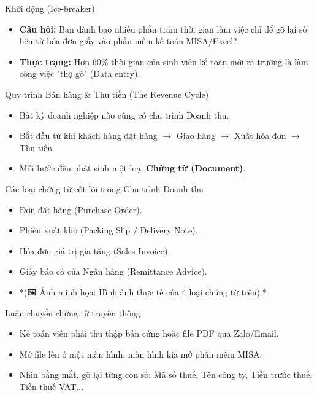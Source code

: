 \documentclass[aspectratio=169]{beamer}
\begin{document}
\begin{frame}{Khởi động (Ice-breaker)}
    \begin{itemize}
        \item \textbf{Câu hỏi:} Bạn dành bao nhiêu phần trăm thời gian làm việc chỉ để gõ lại số liệu từ hóa đơn giấy vào phần mềm kế toán MISA/Excel?
        \item \textbf{Thực trạng:} Hơn 60\% thời gian của sinh viên kế toán mới ra trường là làm công việc "thợ gõ" (Data entry).
    \end{itemize}
\end{frame}


\begin{frame}{Quy trình Bán hàng \& Thu tiền (The Revenue Cycle)}
    \begin{itemize}
        \item Bất kỳ doanh nghiệp nào cũng có chu trình Doanh thu.
        \item Bắt đầu từ khi khách hàng đặt hàng $\rightarrow$ Giao hàng $\rightarrow$ Xuất hóa đơn $\rightarrow$ Thu tiền.
        \item Mỗi bước đều phát sinh một loại \textbf{Chứng từ (Document)}.
    \end{itemize}
\end{frame}


\begin{frame}{Các loại chứng từ cốt lõi trong Chu trình Doanh thu}
    \begin{itemize}
        \item Đơn đặt hàng (Purchase Order).
        \item Phiếu xuất kho (Packing Slip / Delivery Note).
        \item Hóa đơn giá trị gia tăng (Sales Invoice).
        \item Giấy báo có của Ngân hàng (Remittance Advice).
        \item *(🖼️ Ảnh minh họa: Hình ảnh thực tế của 4 loại chứng từ trên).*
    \end{itemize}
\end{frame}


\begin{frame}{Luân chuyển chứng từ truyền thống}
    \begin{itemize}
        \item Kế toán viên phải thu thập bản cứng hoặc file PDF qua Zalo/Email.
        \item Mở file lên ở một màn hình, màn hình kia mở phần mềm MISA.
        \item Nhìn bằng mắt, gõ lại từng con số: Mã số thuế, Tên công ty, Tiền trước thuế, Tiền thuế VAT...
    \end{itemize}
\end{frame}
\end{document}

